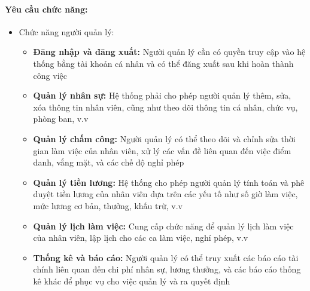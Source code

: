\paragraph{Yêu cầu chức năng:}
\begin{itemize}
    \item Chức năng người quản lý:
    \begin{itemize}
        \item \textbf{Đăng nhập và đăng xuất:} Người quản lý cần có quyền truy cập vào hệ thống bằng tài khoản cá nhân và có thể đăng xuất sau khi hoàn thành công việc
        \item \textbf{Quản lý nhân sự:} Hệ thống phải cho phép người quản lý thêm, sửa, xóa thông tin nhân viên, cũng như theo dõi thông tin cá nhân, chức vụ, phòng ban, v.v
        \item \textbf{Quản lý chấm công:} Người quản lý có thể theo dõi và chỉnh sửa thời gian làm việc của nhân viên, xử lý các vấn đề liên quan đến việc điểm danh, vắng mặt, và các chế độ nghỉ phép
        \item \textbf{Quản lý tiền lương:} Hệ thống cho phép người quản lý tính toán và phê duyệt tiền lương của nhân viên dựa trên các yếu tố như số giờ làm việc, mức lương cơ bản, thưởng, khấu trừ, v.v
        \item \textbf{Quản lý lịch làm việc:} Cung cấp chức năng để quản lý lịch làm việc của nhân viên, lập lịch cho các ca làm việc, nghỉ phép, v.v
        \item \textbf{Thống kê và báo cáo:} Người quản lý có thể truy xuất các báo cáo tài chính liên quan đến chi phí nhân sự, lương thưởng, và các báo cáo thống kê khác để phục vụ cho việc quản lý và ra quyết định
    \end{itemize}
\end{itemize}
